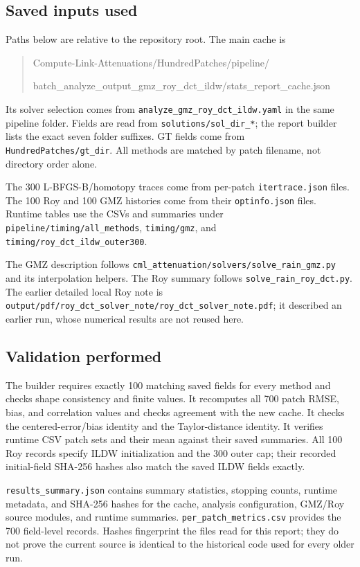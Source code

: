 \documentclass[11pt,a4paper]{article}
\begin{document}
\subsection*{Saved inputs used}
Paths below are relative to the repository root. The main cache is
\begin{quote}\small\ttfamily
Compute-Link-Attenuations/HundredPatches/pipeline/\par
batch\_analyze\_output\_gmz\_roy\_dct\_ildw/stats\_report\_cache.json
\end{quote}
Its solver selection comes from \texttt{analyze\_gmz\_roy\_dct\_ildw.yaml} in the same pipeline folder. Fields are read from \texttt{solutions/sol\_dir\_*}; the report builder lists the exact seven folder suffixes. GT fields come from \texttt{HundredPatches/gt\_dir}. All methods are matched by patch filename, not directory order alone.

The 300 L-BFGS-B/homotopy traces come from per-patch \texttt{itertrace.json} files. The 100 Roy and 100 GMZ histories come from their \texttt{optinfo.json} files. Runtime tables use the CSVs and summaries under \texttt{pipeline/timing/all\_methods}, \texttt{timing/gmz}, and \texttt{timing/roy\_dct\_ildw\_outer300}.

The GMZ description follows \texttt{cml\_attenuation/solvers/solve\_rain\_gmz.py} and its interpolation helpers. The Roy summary follows \texttt{solve\_rain\_roy\_dct.py}. The earlier detailed local Roy note is \texttt{output/pdf/roy\_dct\_solver\_note/roy\_dct\_solver\_note.pdf}; it described an earlier run, whose numerical results are not reused here.

\subsection*{Validation performed}
The builder requires exactly 100 matching saved fields for every method and checks shape consistency and finite values. It recomputes all 700 patch RMSE, bias, and correlation values and checks agreement with the new cache. It checks the centered-error/bias identity and the Taylor-distance identity. It verifies runtime CSV patch sets and their mean against their saved summaries. All 100 Roy records specify ILDW initialization and the 300 outer cap; their recorded initial-field SHA-256 hashes also match the saved ILDW fields exactly.

\texttt{results\_summary.json} contains summary statistics, stopping counts, runtime metadata, and SHA-256 hashes for the cache, analysis configuration, GMZ/Roy source modules, and runtime summaries. \texttt{per\_patch\_metrics.csv} provides the 700 field-level records. Hashes fingerprint the files read for this report; they do not prove the current source is identical to the historical code used for every older run.
\end{document}
